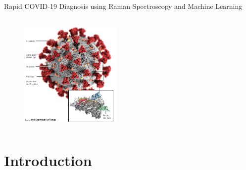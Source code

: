 
\begin{frame}{Rapid COVID-19 Diagnosis using Raman Spectroscopy and Machine Learning}

\begin{columns}[c]
  \begin{figure}
\includegraphics[width=5cm]{figures/covid_virus_logo.jpg}
 \end{figure}
  \vspace{-.4cm}
    \vspace{-.1cm}
    \center{\today}
\end{columns}


\end{frame}

\section{Introduction} %

